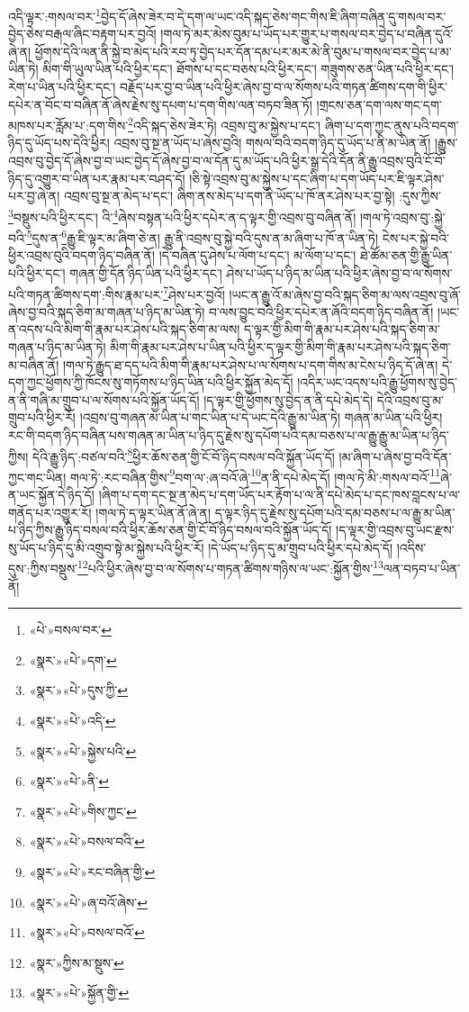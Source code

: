 འདི་ལྟར་:གསལ་བར་\footnote{«པེ་»བསལ་བར་}བྱེད་དོ་ཞེས་ཟེར་བ་དེ་དག་ལ་ཡང་འདི་སྐད་ཅེས་གང་གིས་ཇི་ཞིག་བཞིན་དུ་གསལ་བར་བྱེད་ཅེས་བརྒལ་ཞིང་བརྟག་པར་བྱའོ། །གལ་ཏེ་མར་མེས་བུམ་པ་ཡོད་པར་གྱུར་པ་གསལ་བར་བྱེད་པ་བཞིན་དུའོ་ཞེ་ན། ཕྱོགས་དེའི་ལན་ནི་སྐྱེ་བ་མེད་པའི་རབ་ཏུ་བྱེད་པར་དོན་དམ་པར་མར་མེ་ནི་བུམ་པ་གསལ་བར་བྱེད་པ་མ་ཡིན་ཏེ། མིག་གི་ཡུལ་ཡིན་པའི་ཕྱིར་དང་། ཐོགས་པ་དང་བཅས་པའི་ཕྱིར་དང་། གཟུགས་ཅན་ཡིན་པའི་ཕྱིར་དང་། རེག་པ་ཡིན་པའི་ཕྱིར་དང་། བརྗོད་པར་བྱ་བ་ཡིན་པའི་ཕྱིར་ཞེས་བྱ་བ་ལ་སོགས་པའི་གཏན་ཚིགས་དག་གི་ཕྱིར་དཔེར་ན་བོང་བ་བཞིན་ནོ་ཞེས་རྗེས་སུ་དཔག་པ་དག་གིས་ལན་བཏབ་ཟིན་ཏོ། །གྲངས་ཅན་དག་ལས་གང་དག་མཁས་པར་རློམ་པ་:དག་གིས་\footnote{«སྣར་»«པེ་»དག་}འདི་སྐད་ཅེས་ཟེར་ཏེ། འབྲས་བུ་མ་སྐྱེས་པ་དང་། ཞིག་པ་དག་ཀྱང་ནུས་པའི་བདག་ཉིད་དུ་ཡོད་པས་དེའི་ཕྱིར། འབྲས་བུ་སྔ་ན་ཡོད་པ་ཞེས་བྱའི། གསལ་བའི་བདག་ཉིད་དུ་ཡོད་པ་ནི་མ་ཡིན་ནོ། །རྒྱུས་འབྲས་བུ་བྱེད་དོ་ཞེས་བྱ་བ་ཡང་བྱེད་དོ་ཞེས་བྱ་བ་ལ་དོན་དུ་མ་ཡོད་པའི་ཕྱིར་སྒྲ་དེའི་དོན་ནི་རྒྱུ་འབྲས་བུའི་ངོ་བོ་ཉིད་དུ་འགྱུར་བ་ཡིན་པར་རྣམ་པར་བཤད་དོ། །ཅི་སྟེ་འབྲས་བུ་མ་སྐྱེས་པ་དང་ཞིག་པ་དག་ཡོད་པར་ཇི་ལྟར་ཤེས་པར་བྱ་ཞེ་ན། འབྲས་བུ་སྔ་ན་མེད་པ་དང་། ཞིག་ནས་མེད་པ་དག་ནི་ཡོད་པ་ཁོ་ནར་ཤེས་པར་བྱ་སྟེ། :དུས་ཀྱིས་\footnote{«སྣར་»«པེ་»དུས་ཀྱི་}བསྡུས་པའི་ཕྱིར་དང་། འི་\footnote{«སྣར་»«པེ་»འདི་}ཞེས་བསྟན་པའི་ཕྱིར་དཔེར་ན་ད་ལྟར་གྱི་འབྲས་བུ་བཞིན་ནོ། །གལ་ཏེ་འབྲས་བུ་:སྐྱེ་བའི་\footnote{«སྣར་»«པེ་»སྐྱེས་པའི་}དུས་ན་\footnote{«སྣར་»«པེ་»ནི་}རྒྱུ་ཇི་ལྟར་མ་ཞིག་ཅེ་ན། རྒྱུ་ནི་འབྲས་བུ་སྐྱེ་བའི་དུས་ན་མ་ཞིག་པ་ཁོ་ན་ཡིན་ཏེ། ངེས་པར་སྐྱེ་བའི་ཕྱིར་འབྲས་བུའི་བདག་ཉིད་བཞིན་ནོ། །དེ་བཞིན་དུ་ཤེས་པ་ལོག་པ་དང་། མ་ལོག་པ་དང་། ཐེ་ཚོམ་ཅན་གྱི་རྒྱུ་ཡིན་པའི་ཕྱིར་དང་། གཞན་གྱི་དོན་ཉིད་ཡིན་པའི་ཕྱིར་དང་། ཤེས་པ་ཡོད་པ་ཉིད་མ་ཡིན་པའི་ཕྱིར་ཞེས་བྱ་བ་ལ་སོགས་པའི་གཏན་ཚིགས་དག་:གིས་རྣམ་པར་\footnote{«སྣར་»«པེ་»གིས་ཀྱང་}ཤེས་པར་བྱའོ། །ཡང་ན་རྒྱུ་འོ་མ་ཞེས་བྱ་བའི་སྐད་ཅིག་མ་ལས་འབྲས་བུ་ཞོ་ཞེས་བྱ་བའི་སྐད་ཅིག་མ་གཞན་པ་ཉིད་མ་ཡིན་ཏེ། བ་ལས་བྱུང་བའི་ཕྱིར་དཔེར་ན་ཞོའི་བདག་ཉིད་བཞིན་ནོ། །ཡང་ན་འདས་པའི་མིག་གི་རྣམ་པར་ཤེས་པའི་སྐད་ཅིག་མ་ལས། ད་ལྟར་གྱི་མིག་གི་རྣམ་པར་ཤེས་པའི་སྐད་ཅིག་མ་གཞན་པ་ཉིད་མ་ཡིན་ཏེ། མིག་གི་རྣམ་པར་ཤེས་པ་ཡིན་པའི་ཕྱིར་ད་ལྟར་གྱི་མིག་གི་རྣམ་པར་ཤེས་པའི་སྐད་ཅིག་མ་བཞིན་ནོ། །གལ་ཏེ་རྒྱུད་ཐ་དད་པའི་མིག་གི་རྣམ་པར་ཤེས་པ་ལ་སོགས་པ་དག་གིས་མ་ངེས་པ་ཉིད་དོ་ཞེ་ན། དེ་དག་ཀྱང་ཕྱོགས་ཀྱི་ཁོངས་སུ་གཏོགས་པ་ཉིད་ཡིན་པའི་ཕྱིར་སྐྱོན་མེད་དོ། །འདིར་ཡང་འདས་པའི་རྒྱུ་ཕྱོགས་སུ་བྱེད་ན་ནི་གཞི་མ་གྲུབ་པ་ལ་སོགས་པའི་སྐྱོན་ཡོད་དོ། །ད་ལྟར་གྱི་ཕྱོགས་སུ་བྱེད་ན་ནི་དཔེ་མེད་དེ། དེའི་འབྲས་བུ་མ་གྲུབ་པའི་ཕྱིར་རོ། །འབྲས་བུ་གཞན་མ་ཡིན་པ་གང་ཡིན་པ་དེ་ཡང་དེའི་རྒྱུ་མ་ཡིན་ཏེ། གཞན་མ་ཡིན་པའི་ཕྱིར། རང་གི་བདག་ཉིད་བཞིན་པས་གཞན་མ་ཡིན་པ་ཉིད་དུ་རྗེས་སུ་དཔོག་པའི་དམ་བཅས་པ་ལ་རྒྱུ་རྒྱུ་མ་ཡིན་པ་ཉིད་ཀྱིས། དེའི་རྒྱུ་ཉིད་:བཙལ་བའི་\footnote{«སྣར་»«པེ་»བསལ་བའི་}ཕྱིར་ཆོས་ཅན་གྱི་ངོ་བོ་ཉིད་བསལ་བའི་སྐྱོན་ཡོད་དོ། །མ་ཞིག་པ་ཞེས་བྱ་བའི་དོན་ཀྱང་གང་ཡིན། གལ་ཏེ་:རང་བཞིན་གྱིས་\footnote{«སྣར་»«པེ་»རང་བཞིན་གྱི་}བག་ལ་:ཞ་བའོ་ཞེ་\footnote{«སྣར་»«པེ་»ཞ་བའོ་ཞེས་}ན་ནི་དཔེ་མེད་དོ། །གལ་ཏེ་མི་:གསལ་བའོ་\footnote{«སྣར་»«པེ་»བསལ་བའོ་}ཞེ་ན་ཡང་སྐྱོན་དེ་ཉིད་དོ། །ཞིག་པ་དག་དང་སྔ་ན་མེད་པ་དག་ཡོད་པར་རྟོག་པ་ལ་ནི་དཔེ་མེད་པ་དང་ཁས་བླངས་པ་ལ་གནོད་པར་འགྱུར་རོ། །གལ་ཏེ་ད་ལྟར་ཡིན་ནོ་ཞེ་ན། ད་ལྟར་ཉིད་དུ་རྗེས་སུ་དཔོག་པའི་དམ་བཅས་པ་ལ་རྒྱུ་མ་ཡིན་པ་ཉིད་ཀྱིས་རྒྱུ་ཉིད་བསལ་བའི་ཕྱིར་ཆོས་ཅན་གྱི་ངོ་བོ་ཉིད་བསལ་བའི་སྐྱོན་ཡོད་དོ། །ད་ལྟར་གྱི་འབྲས་བུ་ཡང་རྫས་སུ་ཡོད་པ་ཉིད་དུ་མི་འགྲུབ་སྟེ་མ་སྐྱེས་པའི་ཕྱིར་རོ། །དེ་ཡོད་པ་ཉིད་དུ་མ་གྲུབ་པའི་ཕྱིར་དཔེ་མེད་དོ། །འདིས་དུས་:ཀྱིས་བསྡུས་\footnote{«སྣར་»ཀྱིས་མ་སྡུས་}པའི་ཕྱིར་ཞེས་བྱ་བ་ལ་སོགས་པ་གཏན་ཚིགས་གཉིས་ལ་ཡང་:སྐྱོན་གྱིས་\footnote{«སྣར་»«པེ་»སྐྱོན་གྱི་}ལན་བཏབ་པ་ཡིན་ནོ། 